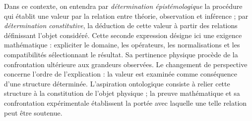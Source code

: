 Dans ce contexte, on entendra par \emph{détermination épistémologique}
la procédure qui établit une valeur par la relation entre théorie,
observation et inférence ; par \emph{détermination constitutive}, la
déduction de cette valeur à partir des relations définissant l'objet
considéré. Cette seconde expression désigne ici une exigence mathématique :
expliciter le domaine, les opérateurs, les normalisations et les
compatibilités sélectionnant le résultat. Sa pertinence physique
procède de la confrontation ultérieure aux grandeurs observées.
Le changement de perspective concerne l'ordre de l'explication : la valeur est
examinée comme conséquence d'une structure déterminée. L'aspiration
ontologique consiste à relier cette structure à la constitution de
l'objet physique ; la preuve mathématique et sa confrontation expérimentale établissent
la portée avec laquelle une telle relation peut être soutenue.


